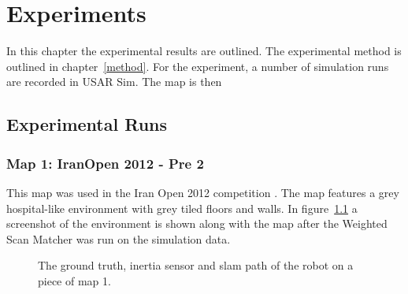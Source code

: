 \chapter{Experiments}
\label{experiments}
In this chapter the experimental results are outlined. The experimental method is outlined in chapter~\ref{method}. For the experiment, a number of simulation runs are recorded in USAR Sim. The map is then 

\section{Experimental Runs}
\subsection{Map 1: IranOpen 2012 - Pre 2}
This map was used in the Iran Open 2012 competition \cite{iran2012}. The map features a grey hospital-like environment with grey tiled floors and walls. In figure~\ref{fig:map1} a screenshot of the environment is shown along with the map after the Weighted Scan Matcher was run on the simulation data. 

\begin{figure}[ht]
\centering
{}
  \caption{The ground truth, inertia sensor and slam path of the robot on a piece of map 1.}
  \label{fig:map1}
\end{figure}

